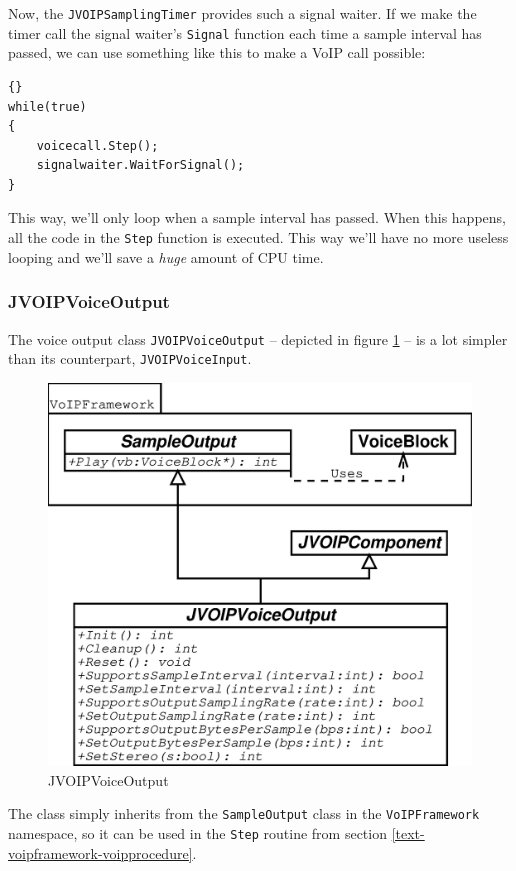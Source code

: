 			Now, the {\tt JVOIPSamplingTimer} provides such a signal waiter. If we make
			the timer call the signal waiter's {\tt Signal} function each time a sample
			interval has passed, we can use something like this to make a VoIP call
			possible:
			\begin{lstlisting}[frame=tb]{}
while(true)
{
	voicecall.Step();
	signalwaiter.WaitForSignal();
}
			\end{lstlisting}
			This way, we'll only loop when a sample interval has passed. When this
			happens, all the code in the {\tt Step} function is executed. This way
			we'll have no more useless looping and we'll save a {\em huge} amount
			of CPU time.
			
			\subsubsection{JVOIPVoiceOutput}
			
			The voice output class {\tt JVOIPVoiceOutput} -- depicted in figure
			\ref{class-jvoipvoiceoutput} -- is a lot simpler than its counterpart,
			{\tt JVOIPVoiceInput}.
			\begin{figure}
				\center
				\includegraphics[width=0.8\linewidth]{images/manual/chapter2/class-jvoipvoiceoutput.eps}
				\caption{JVOIPVoiceOutput}
				\label{class-jvoipvoiceoutput}
			\end{figure}
			
			The class simply inherits from the {\tt SampleOutput} class in the
			{\tt VoIPFramework} namespace, so it can be used in the {\tt Step}
			routine from section \ref{text-voipframework-voipprocedure}.
			

